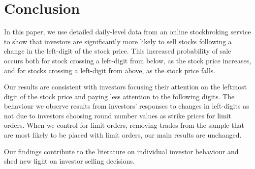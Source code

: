\section{Conclusion}\label{sec:conclusion}

In this paper, we use detailed daily-level data from an online stockbroking service to show that investors are significantly more likely to sell stocks following a change in the left-digit of the stock price. This increased probability of sale occurs both for stock crossing a left-digit from below, as the stock price increases, and for stocks crossing a left-digit from above, as the stock price falls.

Our results are consistent with investors focusing their attention on the leftmost digit of the stock price and paying less attention to the following digits. The behaviour we observe results from investors' responses to changes in left-digits as not due to investors choosing round number values as strike prices for limit orders. When we control for limit orders, removing trades from the sample that are most likely to be placed with limit orders, our main results are unchanged.

Our findings contribute to the literature on individual investor behaviour and shed new light on investor selling decisions. 



